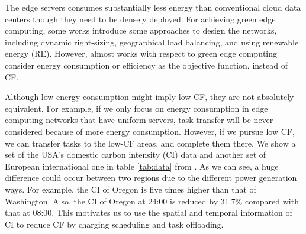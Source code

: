\documentclass[conference, 10pt, ﬁnal, letterpaper, twocolumn]{IEEEtran}
\begin{document}
The edge servers consumes substantially less energy than conventional cloud data centers though they need to be densely deployed. For achieving green edge computing, some works introduce some approaches to design the networks\cite{mao2017survey}, including dynamic right-sizing, geographical load balancing, and using renewable energy (RE). However, almost works with respect to green edge computing consider energy consumption or efficiency as the objective function, instead of CF. 

Although low energy consumption might imply low CF, they are not absolutely equivalent. For example, if we only focus on energy consumption in edge computing networks that have uniform servers, task transfer will be never considered because of more energy consumption. However, if we pursue low CF, we can transfer tasks to the low-CF areas, and complete them there. We show a set of the USA's domestic carbon intensity (CI) data and another set of European international one in table \ref{tab:data} from \cite{ElectricityMaps}. As we can see, a huge difference could occur between two regions due to the different power generation ways.  For example, the CI of Oregon is five times higher than that of Washington. Also, the CI of Oregon at 24:00 is reduced by 31.7\% compared with that at 08:00. This motivates us to use the spatial and temporal information of CI to reduce CF by charging scheduling and task offloading.  
\end{document}
